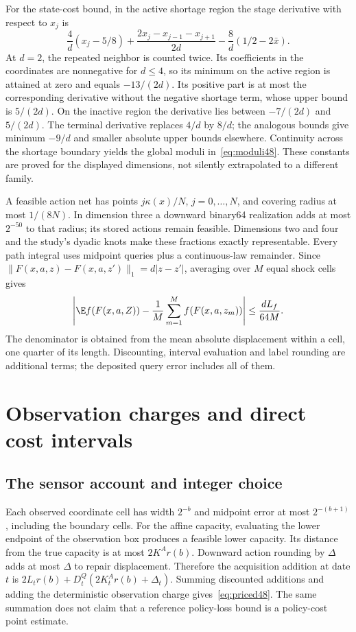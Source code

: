 For the state-cost bound, in the active shortage region the stage derivative with respect to $x_j$ is
\[
 \frac4d(x_j-5/8)+\frac{2x_j-x_{j-1}-x_{j+1}}{2d}
 -\frac8d(1/2-2\bar x).
\]
At $d=2$, the repeated neighbor is counted twice. Its coefficients in the coordinates are nonnegative for $d\le4$, so its minimum on the active region is attained at zero and equals $-13/(2d)$. Its positive part is at most the corresponding derivative without the negative shortage term, whose upper bound is $5/(2d)$. On the inactive region the derivative lies between $-7/(2d)$ and $5/(2d)$. The terminal derivative replaces $4/d$ by $8/d$; the analogous bounds give minimum $-9/d$ and smaller absolute upper bounds elsewhere. Continuity across the shortage boundary yields the global moduli in~\eqref{eq:moduli48}. These constants are proved for the displayed dimensions, not silently extrapolated to a different family.

A feasible action net has points $j\kappa(x)/N$, $j=0,\ldots,N$, and covering radius at most $1/(8N)$. In dimension three a downward binary64 realization adds at most $2^{-50}$ to that radius; its stored actions remain feasible. Dimensions two and four and the study's dyadic knots make these fractions exactly representable. Every path integral uses midpoint queries plus a continuous-law remainder. Since $\|F(x,a,z)-F(x,a,z')\|_1=d|z-z'|$, averaging over $M$ equal shock cells gives
\[
 \left|\E f(F(x,a,Z))-\frac1M\sum_{m=1}^M f(F(x,a,z_m))\right|
 \le\frac{dL_f}{64M}.
\]
The denominator is obtained from the mean absolute displacement within a cell, one quarter of its length. Discounting, interval evaluation and label rounding are additional terms; the deposited query error includes all of them.

\section{Observation charges and direct cost intervals}\label{supp:decisions48}
\subsection{The sensor account and integer choice}
Each observed coordinate cell has width $2^{-b}$ and midpoint error at most $2^{-(b+1)}$, including the boundary cells. For the affine capacity, evaluating the lower endpoint of the observation box produces a feasible lower capacity. Its distance from the true capacity is at most $2K^Ar(b)$. Downward action rounding by $\Delta$ adds at most $\Delta$ to repair displacement. Therefore the acquisition addition at date $t$ is
$2L_tr(b)+D_t^Q(2K_t^Ar(b)+\Delta_t)$.
Summing discounted additions and adding the deterministic observation charge gives~\eqref{eq:priced48}. The same summation does not claim that a reference policy-loss bound is a policy-cost point estimate.

